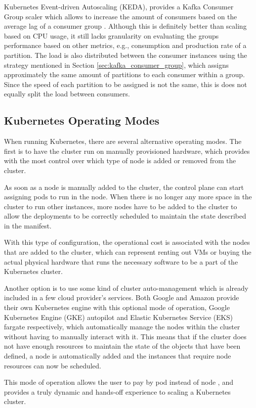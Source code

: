 Kubernetes Event-driven Autoscaling (KEDA), provides a Kafka Consumer Group
scaler which allows to increase the amount of consumers based on the average lag
of a consumer group \cite{KEDA}. Although this is definitely better than scaling
based on CPU usage, it still lacks granularity on evaluating the groups
performance based on other metrics, e.g., consumption and production rate of a
partition. The load is also distributed between the consumer instances using the
strategy mentioned in Section \ref{sec:kafka_consumer_group}, which assigns
approximately the same amount of partitions to each consumer within a group.
Since the speed of each partition to be assigned is not the same, this is does
not equally split the load between consumers.

\subsection{Kubernetes Operating Modes}

When running Kubernetes, there are several alternative operating modes. The
first is to have the cluster run on manually provisioned hardware, which
provides with the most control over which type of node is added or removed from
the cluster. 

As soon as a node is manually added to the cluster, the control plane can start
assigning pods to run in the node. When there is no longer any more space in the
cluster to run other instances, more nodes have to be added to the cluster to
allow the deployments to be correctly scheduled to maintain the state described
in the manifest.

With this type of configuration, the operational cost is associated with the
nodes that are added to the cluster, which can represent renting out VMs or
buying the actual physical hardware that runs the necessary software to be a
part of the Kubernetes cluster.

Another option is to use some kind of cluster auto-management which is already
included in a few cloud provider's services. Both Google and Amazon provide
their own Kubernetes engine with this optional mode of operation, Google
Kubernetes Engine (GKE) autopilot and Elastic Kubernetes Service (EKS) fargate
respectively, which automatically manage the nodes within the cluster without
having to manually interact with it. This means that if the cluster does not
have enough resources to maintain the state of the objects that have been
defined, a node is automatically added and the instances that require node
resources can now be scheduled.

This mode of operation allows the user to pay by pod instead of node
\cite{GKEautopilot, EKSfargate}, and provides a truly dynamic and hands-off
experience to scaling a Kubernetes cluster.

